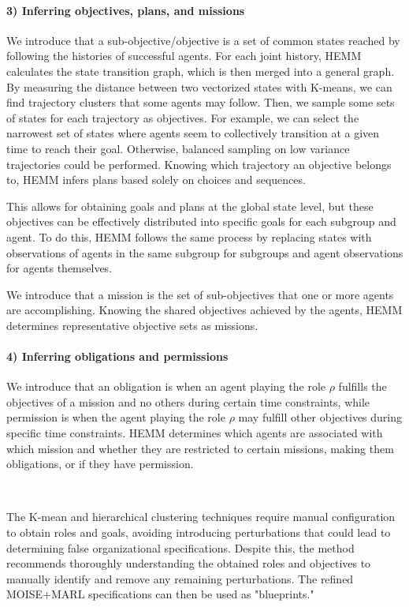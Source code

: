 \documentclass[sigconf,anonymous]{aamas}
\begin{document}
\paragraph{\textbf{3) Inferring objectives, plans, and missions}}

We introduce that a sub-objective/objective is a set of common states reached by following the histories of successful agents.
For each joint history, HEMM calculates the state transition graph, which is then merged into a general graph. By measuring the distance between two vectorized states with K-means, we can find trajectory clusters that some agents may follow. Then, we sample some sets of states for each trajectory as objectives. For example, we can select the narrowest set of states where agents seem to collectively transition at a given time to reach their goal. Otherwise, balanced sampling on low variance trajectories could be performed. Knowing which trajectory an objective belongs to, HEMM infers plans based solely on choices and sequences.

This allows for obtaining goals and plans at the global state level, but these objectives can be effectively distributed into specific goals for each subgroup and agent. To do this, HEMM follows the same process by replacing states with observations of agents in the same subgroup for subgroups and agent observations for agents themselves.

We introduce that a mission is the set of sub-objectives that one or more agents are accomplishing.
Knowing the shared objectives achieved by the agents, HEMM determines representative objective sets as missions.

\paragraph{\textbf{4) Inferring obligations and permissions}}

We introduce that an obligation is when an agent playing the role $\rho$ fulfills the objectives of a mission and no others during certain time constraints, while permission is when the agent playing the role $\rho$ may fulfill other objectives during specific time constraints.
HEMM determines which agents are associated with which mission and whether they are restricted to certain missions, making them obligations, or if they have permission.

\

The K-mean and hierarchical clustering techniques require manual configuration to obtain roles and goals, avoiding introducing perturbations that could lead to determining false organizational specifications. Despite this, the method recommends thoroughly understanding the obtained roles and objectives to manually identify and remove any remaining perturbations. The refined MOISE+MARL specifications can then be used as "blueprints."
\end{document}
